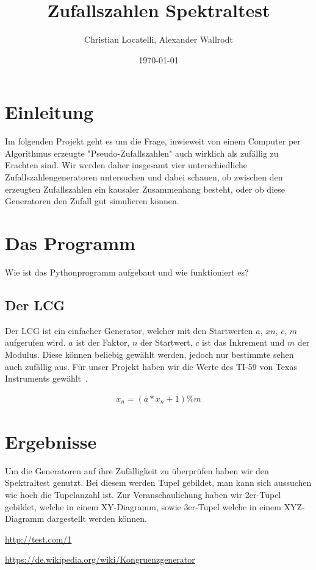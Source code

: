 \documentclass[12pt]{article}
\title{Zufallszahlen Spektraltest}
\author{Christian Locatelli, Alexander Wallrodt}
\date{\today}
\begin{document}
    \maketitle
    \clearpage

    \tableofcontents
    \listoffigures
    \listoftables
    \clearpage


    \section{Einleitung}\label{sec:Einleitung}
    Im folgenden Projekt geht es um die Frage, inwieweit von einem Computer per Algorithmus erzeugte "Pseudo-Zufallszahlen"
    auch wirklich als zufällig zu Erachten sind.
    Wir werden daher insgesamt vier unterschiedliche Zufallszahlengeneratoren untersuchen und dabei schauen,
    ob zwischen den erzeugten Zufallszahlen ein kausaler Zusammenhang besteht,
    oder ob diese Generatoren den Zufall gut simulieren können.



    \section{Das Programm}\label{sec:das-programm}
    Wie ist das Pythonprogramm aufgebaut und wie funktioniert es?
    \subsection{Der LCG}\label{subsec:der-lcg}
    Der LCG ist ein einfacher Generator, welcher mit den Startwerten $a$, $xn$, $c$, $m$ aufgerufen wird.
    $a$ ist der Faktor, $n$ der Startwert, $c$ ist das Inkrement und $m$ der Modulus.
    Diese können beliebig gewählt werden, jedoch nur bestimmte sehen auch zufällig aus.
    Für unser Projekt haben wir die Werte des TI-59 von Texas Instruments gewählt~\cite{lcg}.

    \begin{align*}
    x_n = (a * x_n + 1) \% m
    \end{align*}

    \section{Ergebnisse}\label{sec:Ergebnisse}
    Um die Generatoren auf ihre Zufälligkeit zu überprüfen haben wir den Spektraltest genutzt.
    Bei diesem werden Tupel gebildet, man kann sich aussuchen wie hoch die Tupelanzahl ist.
    Zur Veranschaulichung haben wir 2er-Tupel gebildet, welche in einem XY-Diagramm, sowie 3er-Tupel welche in einem
    XYZ-Diagramm dargestellt werden können.

    \begin{thebibliography}

        \url{http://test.com/1}

        \url{https://de.wikipedia.org/wiki/Kongruenzgenerator}

    \end{thebibliography}
\end{document}
